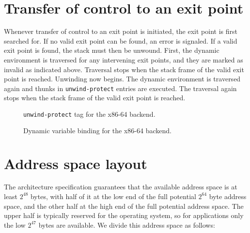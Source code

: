 \section{Transfer of control to an exit point}

Whenever transfer of control to an exit point is initiated, the exit
point is first searched for.  If no valid exit point can be found, an
error is signaled.  If a valid exit point is found, the stack must
then be unwound.  First, the dynamic environment is traversed for any
intervening exit points, and they are marked as invalid as indicated
above.  Traversal stops when the stack frame of the valid exit point
is reached.  Unwinding now begins.  The dynamic environment is
traversed again and thunks in \texttt{unwind-protect} entries are
executed.  The traversal again stops when the stack frame of the valid
exit point is reached.

\begin{figure}
\begin{center}
\end{center}
\caption{\label{fig-x86-64-unwind-protect}
\texttt{unwind-protect} tag for the x86-64 backend.}
\end{figure}

\begin{figure}
\begin{center}
\end{center}
\caption{\label{fig-x86-64-dynamic-binding}
Dynamic variable binding for the x86-64 backend.}
\end{figure}

\section{Address space layout}

The architecture specification guarantees that the available address
space is at least $2^{48}$ bytes, with half of it at the low end of
the full potential $2^{64}$ byte address space, and the other half at
the high end of the full potential address space.  The upper half is
typically reserved for the operating system, so for applications only
the low $2^{47}$ bytes are available.  We divide this address space as
follows:

